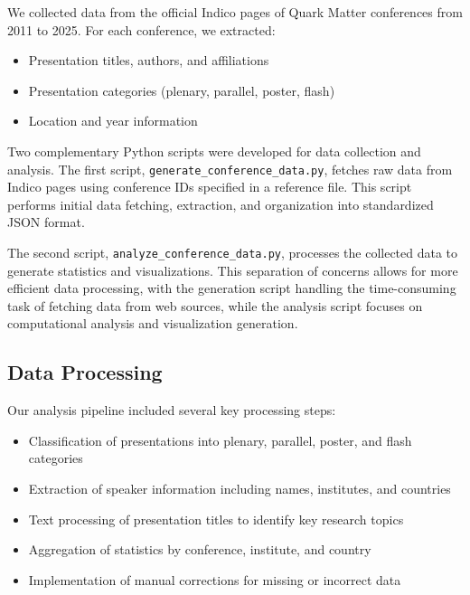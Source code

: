 \documentclass[a4paper,11pt]{article}
\begin{document}
We collected data from the official Indico pages of Quark Matter conferences from 2011 to 2025. For each conference, we extracted:
\begin{itemize}
    \item Presentation titles, authors, and affiliations
    \item Presentation categories (plenary, parallel, poster, flash)
    \item Location and year information
\end{itemize}

Two complementary Python scripts were developed for data collection and analysis. The first script, \texttt{generate\_conference\_data.py}, fetches raw data from Indico pages using conference IDs specified in a reference file. This script performs initial data fetching, extraction, and organization into standardized JSON format.

The second script, \texttt{analyze\_conference\_data.py}, processes the collected data to generate statistics and visualizations. This separation of concerns allows for more efficient data processing, with the generation script handling the time-consuming task of fetching data from web sources, while the analysis script focuses on computational analysis and visualization generation.

\subsection{Data Processing}

Our analysis pipeline included several key processing steps:
\begin{itemize}
    \item Classification of presentations into plenary, parallel, poster, and flash categories
    \item Extraction of speaker information including names, institutes, and countries
    \item Text processing of presentation titles to identify key research topics
    \item Aggregation of statistics by conference, institute, and country
    \item Implementation of manual corrections for missing or incorrect data
\end{itemize}
\end{document}
